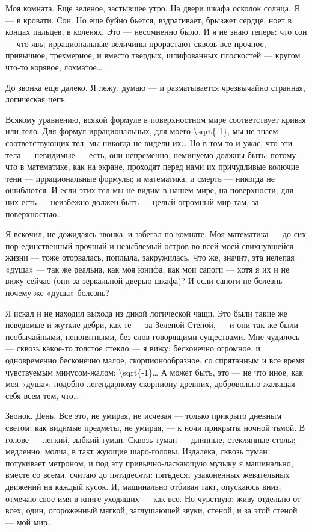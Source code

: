 \documentclass[11pt,openany]{book}
\begin{document}
Моя комната. Еще зеленое, застывшее утро. На двери шкафа осколок солнца. Я --- в кровати. Сон. Но еще буйно бьется, вздрагивает, брызжет сердце, ноет в концах пальцев, в коленях. Это --- несомненно было. И я не знаю теперь: что сон --- что явь; иррациональные величины прорастают сквозь все прочное, привычное, трехмерное, и вместо твердых, шлифованных плоскостей --- кругом что-то корявое, лохматое\ldots{}

До звонка еще далеко. Я лежу, думаю --- и разматывается чрезвычайно странная, логическая цепь.

Всякому уравнению, всякой формуле в поверхностном мире соответствует кривая или тело. Для формул иррациональных, для моего \textbackslash{}sqrt\{-1\}, мы не знаем соответствующих тел, мы никогда не видели их\ldots{} Но в том-то и ужас, что эти тела --- невидимые --- есть, они непременно, неминуемо должны быть: потому что в математике, как на экране, проходят перед нами их причудливые колючие тени --- иррациональные формулы; и математика, и смерть --- никогда не ошибаются. И если этих тел мы не видим в нашем мире, на поверхности, для них есть --- неизбежно должен быть --- целый огромный мир там, за поверхностью\ldots{}

Я вскочил, не дожидаясь звонка, и забегал по комнате. Моя математика --- до сих пор единственный прочный и незыблемый остров во всей моей свихнувшейся жизни --- тоже оторвалась, поплыла, закружилась. Что же, значит, эта нелепая «душа» --- так же реальна, как моя юнифа, как мои сапоги --- хотя я их и не вижу сейчас (они за зеркальной дверью шкафа)? И если сапоги не болезнь --- почему же «душа» болезнь?

Я искал и не находил выхода из дикой логической чащи. Это были такие же неведомые и жуткие дебри, как те --- за Зеленой Стеной, --- и они так же были необычайными, непонятными, без слов говорящими существами. Мне чудилось --- сквозь какое-то толстое стекло --- я вижу: бесконечно огромное, и одновременно бесконечно малое, скорпионообразное, со спрятанным и все время чувствуемым минусом-жалом: \textbackslash{}sqrt\{-1\}\ldots{} А может быть, это --- не что иное, как моя «душа», подобно легендарному скорпиону древних, добровольно жалящая себя всем тем, что\ldots{}

Звонок. День. Все это, не умирая, не исчезая --- только прикрыто дневным светом; как видимые предметы, не умирая, --- к ночи прикрыты ночной тьмой. В голове --- легкий, зыбкий туман. Сквозь туман --- длинные, стеклянные столы; медленно, молча, в такт жующие шаро-головы. Издалека, сквозь туман потукивает метроном, и под эту привычно-ласкающую музыку я машинально, вместе со всеми, считаю до пятидесяти: пятьдесят узаконенных жевательных движений на каждый кусок. И, машинально отбивая такт, опускаюсь вниз, отмечаю свое имя в книге уходящих --- как все. Но чувствую: живу отдельно от всех, один, огороженный мягкой, заглушающей звуки, стеной, и за этой стеной --- мой мир\ldots{}
\end{document}
